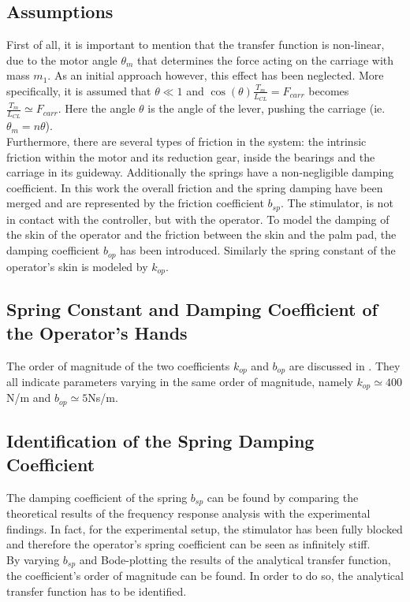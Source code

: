 \subsection{Assumptions}
First of all, it is important to mention that the transfer function is non-linear, due to the motor angle $\theta_m$ that determines the force acting on the carriage with mass $m_1$. As an initial approach however, this effect has been neglected. More specifically, it is assumed that $\theta \ll 1$ and $\cos{(\theta)} \frac{T_m}{L_{CL} } = F_{carr} $ becomes $\frac{T_m}{L_{CL} } \simeq F_{carr} $. Here the angle $\theta$ is the angle of the lever, pushing the carriage (ie. $\theta_m = n \theta$). \\
Furthermore, there are several types of friction in the system: the intrinsic friction within the motor and its reduction gear, inside the bearings and the carriage in its guideway. Additionally the springs have a non-negligible damping coefficient. In this work the overall friction and the spring damping have been merged and are represented by the friction coefficient $b_{sp}$. The stimulator, is not in contact with the controller, but with the operator. To model the damping of the skin of the operator and the friction between the skin and the palm pad, the damping coefficient $b_{op}$ has been introduced. Similarly the spring constant of the operator's skin is modeled by $k_{op}$.\\
	
\subsection{Spring Constant and Damping Coefficient of the Operator's Hands}
The order of magnitude of the two coefficients $k_{op}$ and $b_{op}$ are discussed in \cite{Kuchenbecker2003} \cite{Park2014} \cite{Speich2005}. They all indicate parameters varying in the same order of magnitude, namely $k_{op} \simeq 400$N/m and $b_{op} \simeq 5$Ns/m.\\
	
\subsection{Identification of the Spring Damping Coefficient}
The damping coefficient of the spring $b_{sp}$ can be found by comparing the theoretical results of the frequency response analysis with the experimental findings. In fact, for the experimental setup, the stimulator has been fully blocked and therefore the operator's spring coefficient can be seen as infinitely stiff.\\
By varying $b_{sp}$ and Bode-plotting the results of the analytical transfer function, the coefficient's order of magnitude can be found. In order to do so, the analytical transfer function has to be identified.
	
